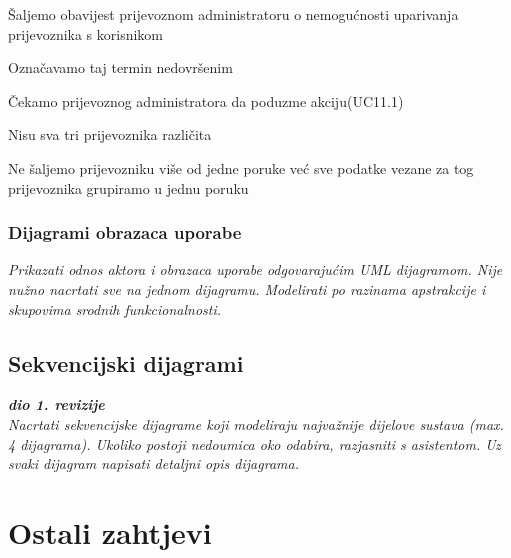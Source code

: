 \begin{packed_item}
\begin{packed_item}
\begin{packed_enum}
								\item Šaljemo obavijest prijevoznom administratoru o nemogućnosti uparivanja prijevoznika s korisnikom
								\item Označavamo taj termin nedovršenim
								\item Čekamo prijevoznog administratora da poduzme akciju(UC11.1)
								
							\end{packed_enum}
							
							\item[4.a] Nisu sva tri prijevoznika različita
							\item[] \begin{packed_enum}
								
								\item Ne šaljemo prijevozniku više od jedne poruke već sve podatke vezane za tog prijevoznika grupiramo u jednu poruku
								
							\end{packed_enum}
							
						\end{packed_item}
					\end{packed_item}
					
				
					
				\subsubsection{Dijagrami obrazaca uporabe}
					
					\textit{Prikazati odnos aktora i obrazaca uporabe odgovarajućim UML dijagramom. Nije nužno nacrtati sve na jednom dijagramu. Modelirati po razinama apstrakcije i skupovima srodnih funkcionalnosti.}
				\eject		
				
			\subsection{Sekvencijski dijagrami}
				
				\textbf{\textit{dio 1. revizije}}\\
				
				\textit{Nacrtati sekvencijske dijagrame koji modeliraju najvažnije dijelove sustava (max. 4 dijagrama). Ukoliko postoji nedoumica oko odabira, razjasniti s asistentom. Uz svaki dijagram napisati detaljni opis dijagrama.}
				\eject
	
		\section{Ostali zahtjevi}
		
